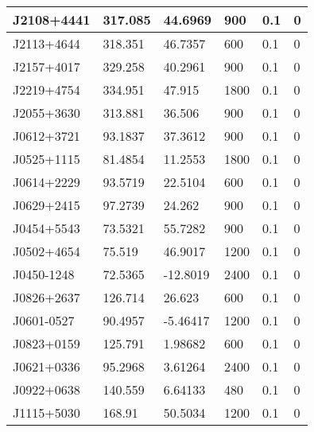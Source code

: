 \begin{table}
\begin{tabular}{|l|l|l|l|l|l|}
				J2108+4441
			 & 317.085 & 44.6969 & 900 & 0.1 & 0 \\ \hline

				J2113+4644
			 & 318.351 & 46.7357 & 600 & 0.1 & 0 \\ \hline

				J2157+4017
			 & 329.258 & 40.2961 & 900 & 0.1 & 0 \\ \hline

				J2219+4754
			 & 334.951 & 47.915 & 1800 & 0.1 & 0 \\ \hline

				J2055+3630
			 & 313.881 & 36.506 & 900 & 0.1 & 0 \\ \hline

				J0612+3721
			 & 93.1837 & 37.3612 & 900 & 0.1 & 0 \\ \hline

				J0525+1115
			 & 81.4854 & 11.2553 & 1800 & 0.1 & 0 \\ \hline

				J0614+2229
			 & 93.5719 & 22.5104 & 600 & 0.1 & 0 \\ \hline

				J0629+2415
			 & 97.2739 & 24.262 & 900 & 0.1 & 0 \\ \hline

				J0454+5543
			 & 73.5321 & 55.7282 & 900 & 0.1 & 0 \\ \hline

				J0502+4654
			 & 75.519 & 46.9017 & 1200 & 0.1 & 0 \\ \hline

				J0450-1248
			 & 72.5365 & -12.8019 & 2400 & 0.1 & 0 \\ \hline

				J0826+2637
			 & 126.714 & 26.623 & 600 & 0.1 & 0 \\ \hline

				J0601-0527
			 & 90.4957 & -5.46417 & 1200 & 0.1 & 0 \\ \hline

				J0823+0159
			 & 125.791 & 1.98682 & 600 & 0.1 & 0 \\ \hline

				J0621+0336
			 & 95.2968 & 3.61264 & 2400 & 0.1 & 0 \\ \hline

				J0922+0638
			 & 140.559 & 6.64133 & 480 & 0.1 & 0 \\ \hline

				J1115+5030
			 & 168.91 & 50.5034 & 1200 & 0.1 & 0 \\ \hline


\end{tabular}
\end{table}
